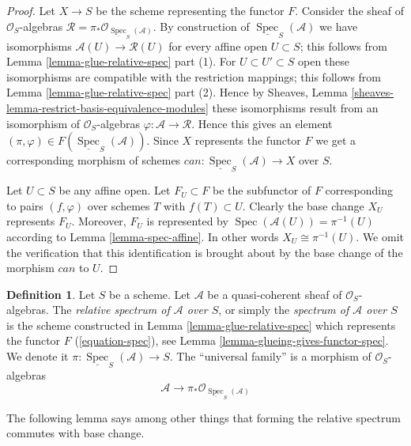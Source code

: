 \documentclass{stacks-project}
\theoremstyle{plain}
\theoremstyle{definition}
\newtheorem{definition}[subsection]{Definition}
\theoremstyle{remark}
\numberwithin{equation}{subsection}
\def\Spec{\mathop{\mathrm{Spec}}}
\begin{document}
\begin{proof}
Let $X \to S$ be the scheme representing the functor $F$.
Consider the sheaf of $\mathcal{O}_S$-algebras
$\mathcal{R} = \pi_*\mathcal{O}_{\underline{\Spec}_S(\mathcal{A})}$.
By construction of $\underline{\Spec}_S(\mathcal{A})$
we have isomorphisms $\mathcal{A}(U) \to \mathcal{R}(U)$
for every affine open $U \subset S$; this follows from
Lemma \ref{lemma-glue-relative-spec} part (1).
For $U \subset U' \subset S$ open these isomorphisms are
compatible with the restriction mappings; this follows from
Lemma \ref{lemma-glue-relative-spec} part (2).
Hence by Sheaves, Lemma \ref{sheaves-lemma-restrict-basis-equivalence-modules}
these isomorphisms result from an isomorphism of $\mathcal{O}_S$-algebras
$\varphi : \mathcal{A} \to \mathcal{R}$. Hence this gives an element
$(\pi, \varphi) \in F(\underline{\Spec}_S(\mathcal{A}))$.
Since $X$ represents the functor $F$ we get a corresponding
morphism of schemes $can : \underline{\Spec}_S(\mathcal{A}) \to X$
over $S$.

\medskip\noindent
Let $U \subset S$ be any affine open. Let $F_U \subset F$ be
the subfunctor of $F$ corresponding to pairs $(f, \varphi)$ over
schemes $T$ with $f(T) \subset U$. Clearly the base change
$X_U$ represents $F_U$. Moreover, $F_U$ is represented by
$\Spec(\mathcal{A}(U)) = \pi^{-1}(U)$ according to
Lemma \ref{lemma-spec-affine}. In other words $X_U \cong \pi^{-1}(U)$.
We omit the verification that this identification is brought about
by the base change of the morphism $can$ to $U$.
\end{proof}

\begin{definition}
\label{definition-relative-spec}
Let $S$ be a scheme. Let $\mathcal{A}$ be a quasi-coherent sheaf of
$\mathcal{O}_S$-algebras. The {\it relative spectrum of $\mathcal{A}$ over
$S$}, or simply the {\it spectrum of $\mathcal{A}$ over $S$} is the scheme
constructed in Lemma \ref{lemma-glue-relative-spec} which represents the
functor $F$ (\ref{equation-spec}), see
Lemma \ref{lemma-glueing-gives-functor-spec}.
We denote it $\pi : \underline{\Spec}_S(\mathcal{A}) \to S$.
The ``universal family'' is a morphism of $\mathcal{O}_S$-algebras
$$
\mathcal{A}
\longrightarrow
\pi_*\mathcal{O}_{\underline{\Spec}_S(\mathcal{A})}
$$
\end{definition}

\noindent
The following lemma says among other things that forming the
relative spectrum commutes with base change.
\end{document}
